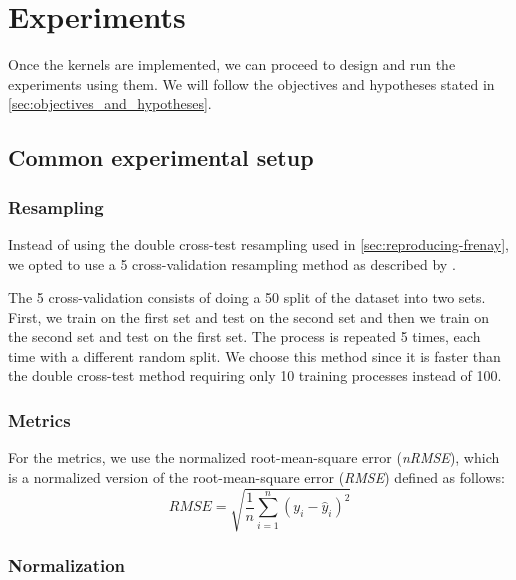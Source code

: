 \chapter{Experiments}
\label{sec:experiments}

Once the kernels are implemented, we can proceed to design and run the experiments using them.
We will follow the objectives and hypotheses stated in \cref{sec:objectives_and_hypotheses}.

\section{Common experimental setup}

\subsection{Resampling}
\label{sec:resampling}

Instead of using the double cross-test resampling used in \cref{sec:reproducing-frenay},
we opted to use a 5 cross-validation resampling method as described by \textcite{dietterichApproximateStatisticalTests1998}.

The 5 cross-validation
consists of doing a 50 split of the dataset into two sets. First, we train on the first set and test on the second set
and then we train on the second set and test on the first set. The process is repeated 5 times, each time
with a different random split. We choose this method since it is faster than the double cross-test method
requiring only 10 training processes instead of 100.


\subsection{Metrics}
\label{sec:metrics}

For the metrics, we use the normalized root-mean-square error (\emph{nRMSE}), which is
a normalized version of the root-mean-square error (\emph{RMSE}) defined as follows:
\begin{equation}
    RMSE = \sqrt{\frac{1}{n}\sum_{i=1}^n (y_i - \hat{y}_i)^2}
\end{equation}

\subsection{Normalization}

